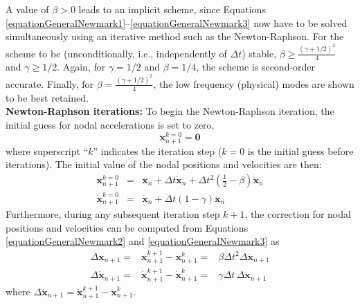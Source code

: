 \documentclass[oneside,11pt,times]{book}
\begin{document}
A value of $\beta > 0$ leads to an implicit scheme, since Equations \eqref{equationGeneralNewmark1}--\eqref{equationGeneralNewmark3} now have to be solved simultaneously using an iterative method such as the Newton-Raphson.
For the scheme to be (unconditionally, i.e., independently of $\Delta t$) stable, $\beta \geq \frac{(\gamma+1/2)^2}{4}$ and $\gamma\geq 1/2$. Again, for $\gamma = 1/2$ and $\beta=1/4$, the scheme is second-order accurate. Finally, for $\beta=\frac{(\gamma+1/2)^2}{4}$, the low frequency (physical) modes are shown to be best retained.\\[5mm]
\textbf{Newton-Raphson iterations:} To begin the Newton-Raphson iteration, the initial guess for nodal accelerations is set to zero,
%
\begin{equation} \label{equationInitialAcceleration}
 \ddot{\bm{x}}^{k=0}_{n+1} = \bm{0}
\end{equation}
%
where superscript ``$k$'' indicates the iteration step ($k = 0$ is the initial guess before iterations). The initial value of the nodal positions and velocities are then:
%
\begin{eqnarray}
 \bm{x}^{k=0}_{n+1} & = & \displaystyle{\bm{x}_{n} + \Delta t \dot{\bm{x}}_{n} + \Delta t^2 \left(
 \frac{1}{2} - \beta \right) \ddot{\bm{x}}_{n}}\label{equationInitialPosition} \\
 \dot{\bm{x}}^{k=0}_{n+1} & = & \displaystyle{\dot{\bm{x}}_{n} + \Delta t \left(1 - \gamma \right)
 \ddot{\bm{x}}_{n}} \label{equationInitialVelocity}
\end{eqnarray}
%
Furthermore, during any subsequent iteration step $k+1$, the correction for nodal positions and velocities can be computed from Equations \eqref{equationGeneralNewmark2} and \eqref{equationGeneralNewmark3} as
%
\begin{eqnarray}
 \Delta \bm{x}_{n+1} = & \bm{x}^{k+1}_{n+1} - \bm{x}^{k}_{n+1} = &  \displaystyle{\beta
 \Delta t^2 \Delta \ddot{\bm{x}}_{n+1}}\label{equationCorrectionPosition} \\
 \Delta \dot{\bm{x}}_{n+1} = & \dot{\bm{x}}^{k+1}_{n+1} - \dot{\bm{x}}^{k}_{n+1} = &
 \displaystyle{\gamma \Delta t \, \Delta \ddot{\bm{x}}_{n+1}} \label{equationCorrectionVelocity}
\end{eqnarray}
%
where $\Delta \ddot{\bm{x}}_{n+1} = \ddot{\bm{x}}^{k+1}_{n+1} - \ddot{\bm{x}}^{k}_{n+1}$.
\end{document}
